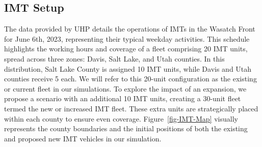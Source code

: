 \documentclass[fancy, oneside, mastersfancy, ms]{byuthesis}
\begin{document}
\hypertarget{sec-IMT_setup}{%
\subsection{IMT Setup}\label{sec-IMT_setup}}

The data provided by UHP details the operations of IMTs in the Wasatch
Front for June 6th, 2023, representing their typical weekday activities.
This schedule highlights the working hours and coverage of a fleet
comprising 20 IMT units, spread across three zones: Davis, Salt Lake,
and Utah counties. In this distribution, Salt Lake County is assigned 10
IMT units, while Davis and Utah counties receive 5 each. We will refer
to this 20-unit configuration as the existing or current fleet in our
simulations. To explore the impact of an expansion, we propose a
scenario with an additional 10 IMT units, creating a 30-unit fleet
termed the new or increased IMT fleet. These extra units are
strategically placed within each county to ensure even coverage.
Figure~\ref{fig-IMT-Map} visually represents the county boundaries and
the initial positions of both the existing and proposed new IMT vehicles
in our simulation.
\end{document}
